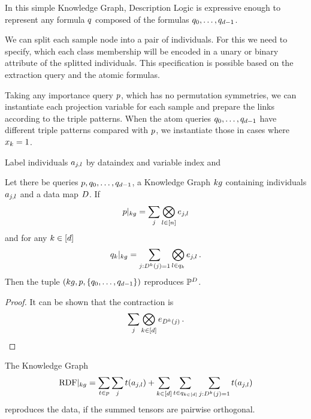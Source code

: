% 
In this simple Knowledge Graph, Description Logic is expressive enough to represent any formula $q$ composed of the formulas $q_{0},\ldots,q_{d-1}$.










\begin{remark}
	We can split each sample node into a pair of individuals.
	For this we need to specify, which each class membership will be encoded in a unary or binary attribute of the splitted individuals.
	This specification is possible based on the extraction query and the atomic formulas.
\end{remark}

% 
Taking any importance query $p$, which has no permutation symmetries, we can instantiate each projection variable for each sample and prepare the links according to the triple patterns.
When the atom queries $q_{0},\ldots,q_{d-1}$ have different triple patterns compared with $p$, we instantiate those in cases where $x_{k}=1$.


%
Label individuals $a_{j,l}$ by dataindex and variable index and

\begin{theorem}
	Let there be queries $p,q_{0},\ldots,q_{d-1}$, a Knowledge Graph $kg$ containing individuals $a_{j,l}$ and a data map $D$.
	If
		\[ {p}|_{kg} = \sum_{j} \bigotimes_{l\in[n]} e_{j,l} \]
	and for any $k\in[d]$
		\[ {q_{k}}|_{kg} 
		= \sum_{j : D^{k}(j)=1} \bigotimes_{l \in q_{k}} e_{j,l} \, . \]
	Then the tuple $(kg,p,\{q_{0},\ldots,q_{d-1}\})$ reproduces $\mathbb{P}^{D}$.
\end{theorem}
\begin{proof}
	It can be shown that the contraction is
		\[ \sum_{j} \bigotimes_{k\in[d]} e_{D^{k}(j)} \, . \]
\end{proof}

\begin{theorem}
	The Knowledge Graph
		\[ {\mathrm{RDF}}|_{kg} = \sum_{t \in p} \sum_{j} t(a_{j,l})
		+ \sum_{k\in[d]} \sum_{t \in q_{k\in[d]}} \sum_{j : D^{k}(j)=1} t(a_{j,l})\]
	reproduces the data, if the summed tensors are pairwise orthogonal.
\end{theorem}

